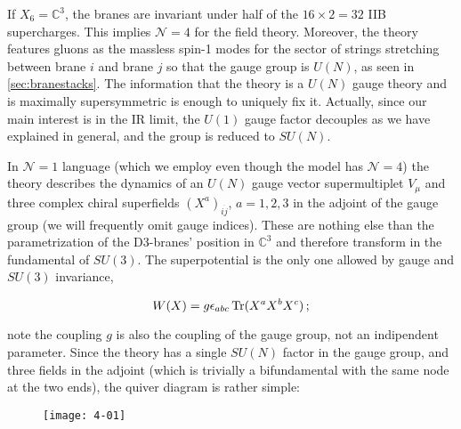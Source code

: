 If $X_6 = \mathbb{C}^3$, the branes are invariant under half of the $16 \times 2 = 32$ IIB supercharges. This implies $\mathcal{N}=4$ for the field theory. Moreover, the theory features gluons as the massless spin-1 modes for the sector of strings stretching between brane $i$ and brane $j$ so that the gauge group is $U(N)$, as seen in \ref{sec:branestacks}. The information that the theory is a $U(N)$ gauge theory and is maximally supersymmetric is enough to uniquely fix it. Actually, since our main interest is in the IR limit, the $U(1)$ gauge factor decouples as we have explained in general, and the group is reduced to $SU(N)$.

In $\mathcal{N}=1$ language (which we employ even though the model has $\mathcal{N}=4$) the theory describes the dynamics of an $U(N)$ gauge vector supermultiplet $V_\mu$ and three complex chiral superfields $(X^a)_{i\dot j}$, $a=1,2,3$ in the adjoint of the gauge group (we will frequently omit gauge indices). These are nothing else than the parametrization of the D3-branes' position in $\mathbb{C}^3$ and therefore transform in the fundamental of $SU(3)$. The superpotential is the only one allowed by gauge and $SU(3)$ invariance,

\begin{equation} W(X) = g \epsilon_{abc} \operatorname{Tr} ( X^a X^b X^c) \label{sym4potential}\,;
\end{equation}

note the coupling $g$ is also the coupling of the gauge group, not an indipendent parameter. Since the theory has a single $SU(N)$ factor in the gauge group, and three fields in the adjoint (which is trivially a bifundamental with the same node at the two ends), the quiver diagram is rather simple:


\begin{figure}[H]
	\centering
	\texttt{[image: 4-01]}
\end{figure}


